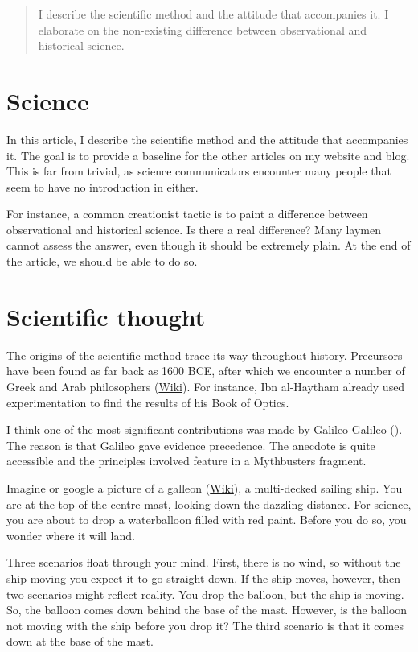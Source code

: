 \begin{abstract}
 
I describe the scientific method and the attitude that accompanies it. I elaborate on the non-existing difference between observational and historical science.
\end{abstract}
\begin{multicols}{2}
\section{Science}

In this article, I describe the scientific method and the attitude that accompanies it. The goal is to provide a baseline
for the other articles on my website and blog. This is far from trivial, as science communicators encounter many people
that seem to have no introduction in either.


For instance, a common creationist tactic is to paint a difference between observational and historical science. Is there
a real difference? Many laymen cannot assess the answer, even though it should be extremely plain. At the end of the article, we
should be able to do so.

\section{Scientific thought}

The origins of the scientific method trace its way throughout history. Precursors have been found as far back as 1600 BCE,
after which we encounter a number of Greek and Arab philosophers (\href{http://en.wikipedia.org/wiki/List_of_ancient_Greek_philosophers}{Wiki}). For instance, Ibn al-Haytham already used experimentation
to find the results of his Book of Optics. 


I think one of the most significant contributions was made by Galileo Galileo (\href{https://en.wikipedia.org/wiki/Galileo_Galilei"
target="_new">Wiki}). The reason is that Galileo gave evidence precedence. The anecdote is quite accessible and the principles involved
feature in a Mythbusters fragment.  


Imagine or google a picture of a galleon (\href{https://en.wikipedia.org/wiki/Galleon}{Wiki}), a multi-decked sailing ship.
You are at the top of the centre mast, looking down the dazzling distance. For science, you are about to drop a waterballoon filled with red paint.
Before you do so, you wonder where it will land.


Three scenarios float through your mind. First, there is no wind, so without the ship moving you expect it to go straight down. If the ship moves,
however, then two scenarios might reflect reality. You drop the balloon, but the ship is moving. So, the balloon comes down behind the base of
the mast. However, is the balloon not moving with the ship before you drop it? The third scenario is that it comes down at the base of the mast.



\end{multicols}

